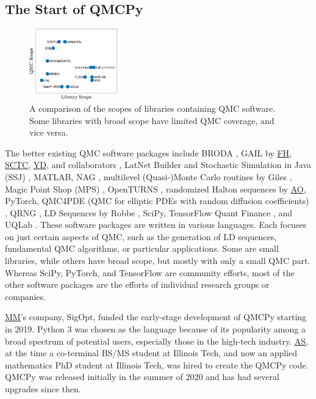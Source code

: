 \documentclass[11pt]{NSFamsart}
\newcommand{\FH}{\hyperlink{FHlink}{FH}\xspace}
\newcommand{\SCTC}{\hyperlink{SCTClink}{SCTC}\xspace}
\newcommand{\AO}{\hyperlink{AOlink}{AO}\xspace}
\newcommand{\MM}{\hyperlink{MMlink}{MM}\xspace}
\newcommand{\YD}{\hyperlink{YDlink}{YD}\xspace}
\newcommand{\AS}{\hyperlink{ASlink}{AS}\xspace}
\newcommand{\SciPy}{SciPy\xspace}
\newcommand{\TensorFlow}{TensorFlow\xspace}
\newcommand{\MATLAB}{MATLAB\xspace}
\newcommand{\PyTorch}{PyTorch\xspace}
\begin{document}
\subsection*{The Start of QMCPy}

\begin{figure}
	\includegraphics[width = 0.34\textwidth]{ProgramsImages/QMCSoftwarePlot.eps}
	\caption{A comparison of the scopes of libraries containing QMC software.  Some libraries with broad scope have limited QMC coverage, and vice versa.}
	\vspace{-0.3cm}
\end{figure}

\sloppypar The better existing QMC software packages include
BRODA \cite{BRODA20a}, GAIL by \FH, \SCTC, \YD, and collaborators \cite{ChoEtal21a}, LatNet Builder \cite{LatNet} and Stochastic Simulation in Java (SSJ) \cite{SSJ}, \MATLAB \cite{MAT9.10}, NAG \cite{NAG27}, multilevel (Quasi-)Monte Carlo routines  by Giles \cite{GilesSoft}, Magic Point Shop (MPS) \cite{Nuy17a}, OpenTURNS \cite{OpenTURNS}, randomized Halton sequences by \AO \cite{Owe20a}, \PyTorch \cite{paszke2019pytorch}, QMC4PDE (QMC for elliptic PDEs with random diffusion coefficients) \cite{KuoNuy16a}, QRNG \cite{QRNG2020}, LD Sequences by Robbe \cite{Rob20a}, \SciPy \cite{virtanen2020scipy},  \TensorFlow Quant Finance \cite{tfqf2021a}, and
UQLab \cite{UQLab2014}.  These software packages are written in various languages.  
Each focuses on just certain aspects of QMC, such as the generation of LD sequences, fundamental QMC algorithms, or particular applications.  Some are small libraries, while others have broad scope, but mostly with only a small QMC part.  Whereas \SciPy, \PyTorch, and \TensorFlow are community efforts, most of the other software packages are the efforts of individual research groups or companies.

\MM's company, SigOpt, funded the early-stage development of  QMCPy starting in 2019. Python 3 was chosen as the language because of its popularity among a broad spectrum of potential users, especially those in the high-tech industry.  \AS,  at the time a co-terminal BS/MS student at Illinois Tech, and now an applied mathematics PhD student at Illinois Tech, was hired to create the QMCPy code.  QMCPy was released initially in the summer of 2020 and has had several upgrades since then. 
\end{document}
